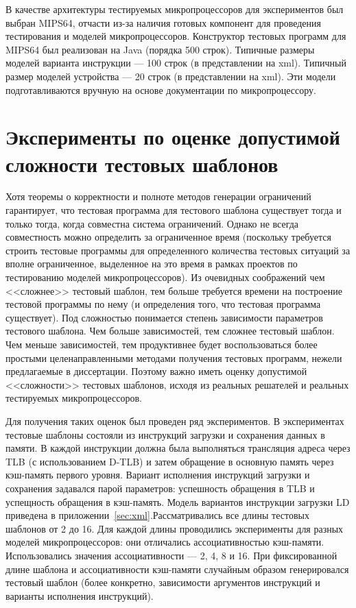 В качестве архитектуры тестируемых микропроцессоров для экспериментов был выбран MIPS64, отчасти из-за наличия готовых компонент для проведения тестирования и моделей микропроцессоров. Конструктор тестовых программ для MIPS64 был реализован на Java (порядка 500 строк). Типичные размеры моделей варианта инструкции --- 100 строк (в представлении на xml). Типичный размер моделей устройства --- 20 строк (в представлении на xml). Эти модели подготавливаются вручную на основе документации по микропроцессору.

\section{Эксперименты по оценке допустимой сложности тестовых шаблонов}\label{sec:templates_estimation}


Хотя теоремы о корректности и полноте методов генерации ограничений гарантирует, что тестовая программа для тестового шаблона существует тогда и только тогда, когда совместна система ограничений. Однако не всегда совместность можно определить за ограниченное время (поскольку требуется строить тестовые программы для определенного количества тестовых ситуаций за вполне ограниченное, выделенное на это время в рамках проектов по тестированию моделей микропроцессоров). Из очевидных соображений чем <<сложнее>> тестовый шаблон, тем больше требуется времени на построение тестовой программы по нему (и определения того, что тестовая программа существует). Под сложностью понимается степень зависимости параметров тестового шаблона. Чем больше зависимостей, тем сложнее тестовый шаблон. Чем меньше зависимостей, тем продуктивнее будет воспользоваться более простыми целенаправленными методами получения тестовых программ, нежели предлагаемые в диссертации. Поэтому важно иметь оценку допустимой <<сложности>> тестовых шаблонов, исходя из реальных решателей и реальных тестируемых микропроцессоров.

Для получения таких оценок был проведен ряд экспериментов. В экспериментах тестовые шаблоны состояли из инструкций загрузки и сохранения
данных в памяти. В каждой инструкции должна была выполняться трансляция адреса
через TLB (с использованием D-TLB) и затем обращение в основную память через
кэш-память первого уровня. Вариант исполнения инструкций загрузки и сохранения задавался парой параметров: успешность обращения в TLB и успещность обращения в кэш-память. Модель вариантов инструкции загрузки LD приведена в приложении~\ref{sec:xml}.Рассматривались все длины тестовых шаблонов от 2 до
16. Для каждой длины проводились эксперименты для разных моделей микропроцессоров: они отличались ассоциативностью кэш-памяти. Использовались значения ассоциативности --- 2, 4, 8 и 16. При фиксированной длине шаблона и ассоциативности кэш-памяти случайным образом генерировался тестовый шаблон (более конкретно, зависимости аргументов инструкций и варианты исполнения инструкций).

